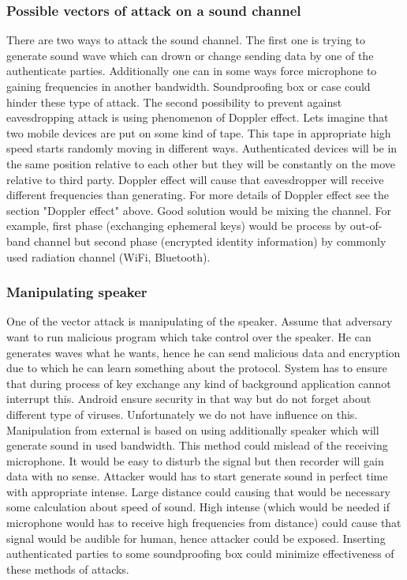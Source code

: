 \documentclass[11pt,titlepage]{article}
\theoremstyle{plain}
\begin{document}
\subsubsection{Possible vectors of attack on a sound channel}
There are two ways to attack the sound channel. The first one is trying to generate sound wave which can drown or change sending data by one of the authenticate parties. Additionally one can in some ways force microphone to gaining frequencies in another bandwidth. Soundproofing box or case could hinder these type of attack. The second possibility to prevent against eavesdropping attack is using phenomenon of Doppler effect. Lets imagine that two mobile devices are put on some kind of tape. This tape in appropriate high speed starts randomly moving in different ways. Authenticated devices will be in the same position relative to each other but they will be constantly on the move relative to third party. Doppler effect will cause that eavesdropper will receive different frequencies than generating. For more details of Doppler effect see the section "Doppler effect" above. Good solution would be mixing the channel. For example, first phase (exchanging ephemeral keys) would be process by out-of-band channel but second phase (encrypted identity information) by commonly used radiation channel (WiFi, Bluetooth).

\subsubsection{Manipulating speaker}
One of the vector attack is manipulating of the speaker. Assume that adversary want to run malicious program which take control over the speaker. He can generates waves what he wants, hence he can send malicious data and encryption due to which he can learn something about the protocol. System has to ensure that during process of key exchange any kind of background application cannot interrupt this. Android ensure security in that way but do not forget about different type of viruses. Unfortunately we do not have influence on this. Manipulation from external is based on using additionally speaker which will generate sound in used bandwidth. This method could mislead of the receiving microphone. It would be easy to disturb the signal but then recorder will gain data with no sense. Attacker would has to start generate sound in perfect time with appropriate intense. Large distance could causing that would be necessary some calculation about speed of sound. High intense (which would be needed if microphone would has to receive high frequencies from distance) could cause that signal would be audible for human, hence attacker could be exposed. Inserting authenticated parties to some soundproofing box could minimize effectiveness of these methods of attacks.
\end{document}
